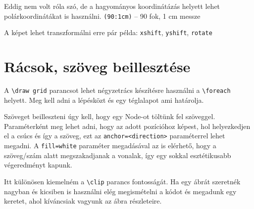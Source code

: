 Eddig nem volt róla szó, de a hagyományos koordinátázás helyett lehet polárkoordinátákat is használni. \verb|(90:1cm)| -- 90 fok, 1 cm messze

A képet lehet transzformálni erre pár példa: \verb|xshift|, \verb|yshift|, \verb|rotate|

\begin{tikzExample}
\end{tikzExample}

\section{Rácsok, szöveg beillesztése}

A \verb|\draw grid| parancsot lehet négyzetrács készítésre használni a \verb|\foreach| helyett. Meg kell adni a lépésközt és egy téglalapot ami határolja.

Szöveget beilleszteni úgy kell, hogy egy Node-ot töltünk fel szöveggel. Paraméterként meg lehet adni, hogy az adott pozícióhoz képest, hol helyezkedjen el a csúcs és így a szöveg, ezt az \verb|anchor=<direction>| paraméterrel lehet megadni. A \verb|fill=white| paraméter megadásával az is elérhető, hogy a szöveg/szám alatt megszakadjanak a vonalak, így egy sokkal esztétikusabb végeredményt kapunk. 

Itt különösen kiemelném a \verb|\clip| parancs fontosságát. Ha egy ábrát szeretnék nagyban és kicsiben is használni elég megismételni a kódot és megadunk egy keretet, ahol kíváncsiak vagyunk az ábra részleteire. 

